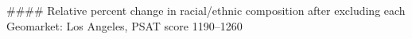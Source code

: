 #### Relative percent change in racial/ethnic composition after excluding each Geomarket: Los Angeles, PSAT score 1190–1260
